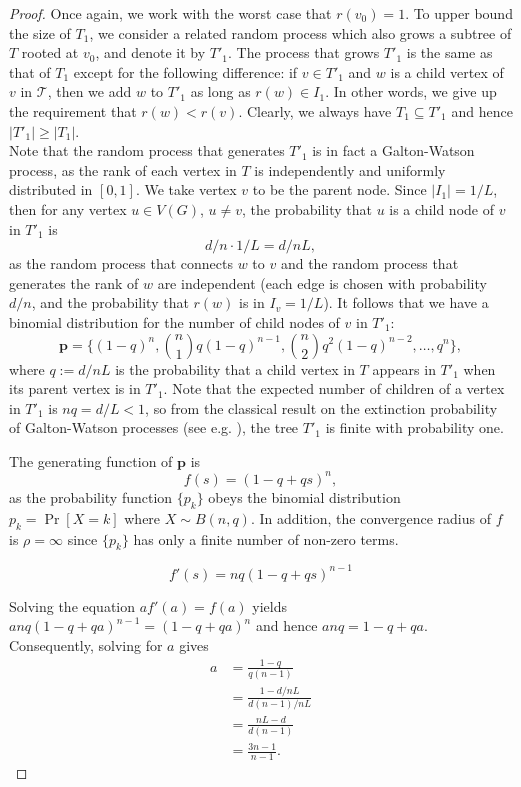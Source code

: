 \documentclass[english, oribibl]{llncs}
\newcommand{\mygamma}{L}
\begin{document}
\begin{proof}
Once again, we work with the worst case that $r(v_{0})=1$.
To upper bound the size of $T_{1}$, we consider a related random process which also
grows a subtree of $T$ rooted at $v_{0}$, and denote it by $T'_{1}$.
The process that grows $T'_{1}$ is the same as that of $T_{1}$
except for the following difference: if $v\in T'_{1}$ and $w$ is a child vertex of $v$ in $\mathcal{T}$,
then we add $w$ to $T'_{1}$ as long as $r(w) \in I_{1}$. In other words, we give up the requirement that $r(w)<r(v)$.
Clearly, we always have $T_{1}\subseteq T'_{1}$ and hence $|T'_{1}|\geq |T_{1}|$.\\


Note that the random process that generates $T'_{1}$ is in fact a Galton-Watson process,
as the rank of each vertex in $T$ is independently and uniformly distributed in $[0,1]$.
We take vertex $v$ to be the parent node. Since $|I_{1}|=1/\mygamma$,
then for any vertex $u\in V(G)$, $u\neq v$,
the probability that $u$ is a child node of $v$ in $T'_{1}$ is
\[
d/n \cdot 1/\mygamma = d/n\mygamma,
\]
as the random process that connects $w$ to $v$ and
the random process that generates the rank of $w$ are independent
(each edge is chosen with probability $d/n$, and the probability that $r(w)$ is in $I_v = 1/\mygamma$).
It follows that we have a binomial distribution for the number of child nodes of $v$ in $T'_{1}$:
\[
\mathbf{p}=\{(1-q)^n, \binom{n}{1}q(1-q)^{n-1}, \binom{n}{2}q^{2}(1-q)^{n-2}, \ldots, q^{n}\},
\]
where $q:=d/n\mygamma$ is the probability that a child vertex in $T$
appears in $T'_{1}$ when its parent vertex is in $T'_{1}$.
Note that the expected number of children of a vertex in $T'_{1}$ is $nq=d/\mygamma<1$,
so from the classical result on the extinction probability of Galton-Watson processes (see e.g. \cite{Har63}),
the tree $T'_{1}$ is finite with probability one.

The generating function of $\mathbf{p}$ is
\[
f(s)=(1-q+qs)^{n},
\]
as the probability function $\{p_{k}\}$ obeys the binomial distribution $p_{k}=\Pr[X=k]$
where $X\sim B(n,q)$.
In addition, the convergence radius of $f$ is $\rho=\infty$
since $\{p_{k}\}$ has only a finite number of non-zero terms.

\[
f'(s) = nq(1-q+qs)^{n-1}
\]

Solving the equation $af'(a)=f(a)$ yields
$anq(1-q+qa)^{n-1} =  (1-q+qa)^{n}$ and hence
$anq = 1-q+qa $.
Consequently, solving for $a$ gives
\begin{align*}
a& = \frac{1-q}{q(n-1)}\\
& = \frac{1-d/n\mygamma}{d(n-1)/n\mygamma}\\
& = \frac{n\mygamma - d}{d(n-1)} \\
& = \frac{3n-1}{n-1}.
\end{align*}


\end{proof}
\end{document}
